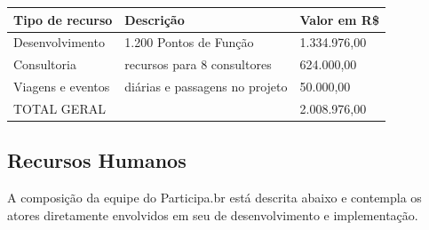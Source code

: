 \documentclass{article}
\begin{document}
\begin{center}
    \begin{tabular}{ | l | l | l |}
    \hline
    Tipo de recurso   & Descrição & Valor em R\$ \\
    \hline
    Desenvolvimento   & 1.200 Pontos de Função         & 1.334.976,00 \\
    Consultoria       & recursos para 8 consultores    & 624.000,00   \\
    Viagens e eventos & diárias e passagens no projeto & 50.000,00    \\
    \hline
    TOTAL GERAL       &                                & 2.008.976,00 \\
    \hline
    \end{tabular}
\end{center}

\subsection{Recursos Humanos}

A composição da equipe do Participa.br está descrita abaixo e contempla os
atores diretamente envolvidos em seu de desenvolvimento e implementação.
\end{document}
